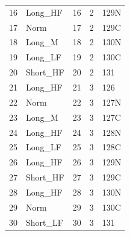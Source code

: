 \begin{table}[!ht]
\begin{tabular*}{0.95\textwidth}{lllll}
16                                        & Long\_HF           & 16                    & 2                & 129N      \\
17                                        & Norm               & 17                    & 2                & 129C      \\
18                                        & Long\_M            & 18                    & 2                & 130N      \\
19                                        & Long\_LF           & 19                    & 2                & 130C      \\
20                                        & Short\_HF          & 20                    & 2                & 131       \\
21                                        & Long\_HF           & 21                    & 3                & 126       \\
22                                        & Norm               & 22                    & 3                & 127N      \\
23                                        & Long\_M            & 23                    & 3                & 127C      \\
24                                        & Long\_HF           & 24                    & 3                & 128N      \\
25                                        & Long\_LF           & 25                    & 3                & 128C      \\
26                                        & Long\_HF           & 26                    & 3                & 129N      \\
27                                        & Short\_HF          & 27                    & 3                & 129C      \\
28                                        & Long\_HF           & 28                    & 3                & 130N      \\
29                                        & Norm               & 29                    & 3                & 130C      \\
30                                        & Short\_LF          & 30                    & 3                & 131      
\end{tabular*}
\end{table}
